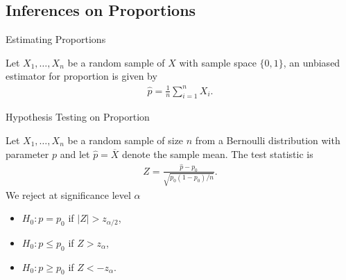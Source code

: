 \subsection{Inferences on Proportions}

\begin{frame}{Estimating Proportions}

\justifying
{} Let $X_1, \ldots, X_n$ be a random sample of $X$ with sample space $\{0, 1\}$, an unbiased estimator for proportion is given by
\begin{align*}
\widehat{p} = \frac{1}{n}\sum_{i=1}^n X_i.
\end{align*}

\end{frame}

\begin{frame}{Hypothesis Testing on Proportion}

\justifying
{} Let $X_1, \ldots, X_n$ be a random sample of size $n$ from a Bernoulli distribution with parameter $p$ and let $\widehat{p} = \overline{X}$ denote the sample mean. The test statistic is 
\begin{align*}
Z = \frac{\widehat{p} - p_0}{\sqrt{p_0(1-p_0)/n}}.
\end{align*}
We reject at significance level $\alpha$
\begin{itemize}
	\item $H_0: p = p_0$ if $|Z| > z_{\alpha/2}$,
	\item $H_0: p\leq p_0$ if $Z > z_{\alpha}$,
	\item $H_0: p\geq p_0$ if $Z < -z_{\alpha}$.
\end{itemize}

\end{frame}

